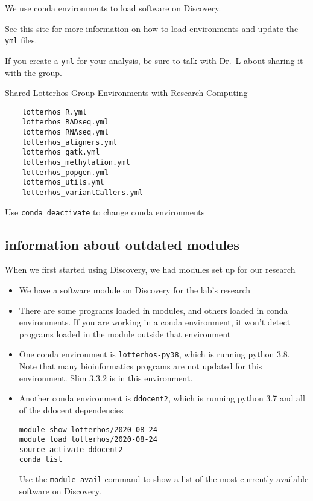 \documentclass[
  letterpaper,
  DIV=11,
  numbers=noendperiod]{scrreprt}
\begin{document}
We use conda environments to load software on Discovery.

See this site for more information on how to load environments and
update the \texttt{yml} files.

If you create a \texttt{yml} for your analysis, be sure to talk with
Dr.~L about sharing it with the group.

\href{https://github.com/neu-rc-admin/lotterhos_group}{Shared Lotterhos
Group Environments with Research Computing}

\begin{verbatim}
    lotterhos_R.yml
    lotterhos_RADseq.yml
    lotterhos_RNAseq.yml
    lotterhos_aligners.yml
    lotterhos_gatk.yml
    lotterhos_methylation.yml
    lotterhos_popgen.yml
    lotterhos_utils.yml
    lotterhos_variantCallers.yml
\end{verbatim}

Use \texttt{conda\ deactivate} to change conda environments

\hypertarget{information-about-outdated-modules}{%
\subsection*{\texorpdfstring{\textbf{information about outdated
modules}}{information about outdated modules}}\label{information-about-outdated-modules}}

When we first started using Discovery, we had modules set up for our
research

\begin{itemize}
\item
  We have a software module on Discovery for the lab's research
\item
  There are some programs loaded in modules, and others loaded in conda
  environments. If you are working in a conda environment, it won't
  detect programs loaded in the module outside that environment
\item
  One conda environment is \texttt{lotterhos-py38}, which is running
  python 3.8. Note that many bioinformatics programs are not updated for
  this environment. Slim 3.3.2 is in this environment.
\item
  Another conda environment is \texttt{ddocent2}, which is running
  python 3.7 and all of the ddocent dependencies

\begin{verbatim}
module show lotterhos/2020-08-24
module load lotterhos/2020-08-24
source activate ddocent2
conda list
\end{verbatim}

  Use the \texttt{module\ avail} command to show a list of the most
  currently available software on Discovery.
\end{itemize}
\end{document}
